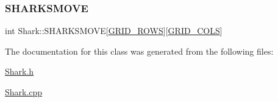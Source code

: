 \mbox{\label{class_shark_aa03f93cdce80f7dac4c26e4bb73d0547}} 
\subsubsection{\texorpdfstring{S\+H\+A\+R\+K\+S\+M\+O\+VE}{SHARKSMOVE}}
{\footnotesize\ttfamily int Shark\+::\+S\+H\+A\+R\+K\+S\+M\+O\+VE\mbox{[}\mbox{\hyperlink{_config_8h_a5ba0b105774bfdc09ce545d73dcdedd3}{G\+R\+I\+D\+\_\+\+R\+O\+WS}}\mbox{]}\mbox{[}\mbox{\hyperlink{_config_8h_a881e2cda79b5951641b07f678f6ef929}{G\+R\+I\+D\+\_\+\+C\+O\+LS}}\mbox{]}}



The documentation for this class was generated from the following files\+:\begin{DoxyCompactItemize}
\item 
\mbox{\hyperlink{_shark_8h}{Shark.\+h}}\item 
\mbox{\hyperlink{_shark_8cpp}{Shark.\+cpp}}\end{DoxyCompactItemize}
